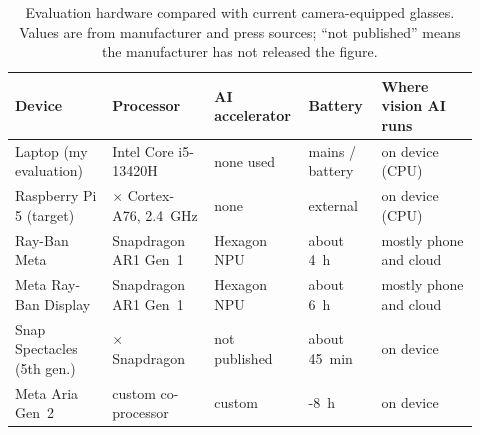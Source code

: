 \begin{table}[htbp]
\begin{singlespace}
\centering
\caption{Evaluation hardware compared with current camera-equipped glasses.
Values are from manufacturer and press sources; ``not published'' means the
manufacturer has not released the figure.}
\label{tab:glasses}
\renewcommand{\arraystretch}{1.3}
\small
\setlength{\tabcolsep}{4pt}
\begin{tabular}{@{}>{\raggedright\arraybackslash}p{0.20\linewidth}
                 >{\raggedright\arraybackslash}p{0.21\linewidth}
                 >{\raggedright\arraybackslash}p{0.16\linewidth}
                 >{\raggedright\arraybackslash}p{0.15\linewidth}
                 >{\raggedright\arraybackslash}p{0.20\linewidth}@{}}
\toprule
\textbf{Device} & \textbf{Processor} & \textbf{AI accelerator} & \textbf{Battery} & \textbf{Where vision AI runs} \\
\midrule
Laptop (my evaluation)    & Intel Core i5-13420H & none used & mains / battery & on device (CPU) \\
Raspberry Pi 5 (target) & 4$\times$ Cortex-A76, 2.4~GHz & none & external & on device (CPU) \\
Ray-Ban Meta          & Snapdragon AR1 Gen~1 & Hexagon NPU & about 4~h & mostly phone and cloud \\
Meta Ray-Ban Display  & Snapdragon AR1 Gen~1 & Hexagon NPU & about 6~h & mostly phone and cloud \\
Snap Spectacles (5th gen.) & 2$\times$ Snapdragon & not published & about 45~min & on device \\
Meta Aria Gen~2       & custom co-processor & custom & 6-8~h & on device \\
\bottomrule
\end{tabular}
\end{singlespace}
\end{table}

